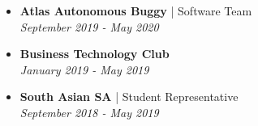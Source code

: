 \documentclass[10pt,a4paper,ragged2e,withhyper]{altacv}
\begin{document}
\begin{paracol}{2}


\divider


\divider


\divider



\begin{itemize}
\item \textbf{Atlas Autonomous Buggy} | Software Team \\ \smallskip
\textit{September 2019 - May 2020}

\item \textbf{Business Technology Club} \\ \smallskip
\textit{January 2019 - May 2019}

\item \textbf{South Asian SA} | Student Representative \\ \smallskip
\textit{September 2018 - May 2019}
\end{itemize}

\end{paracol}
\end{document}

